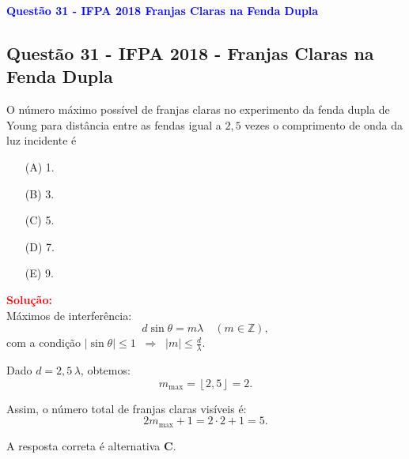 \begin{flushleft}
\textbf{\textcolor{blue}{\Large Quest\~ao 31 - IFPA 2018 Franjas Claras na Fenda Dupla}}\\
\noindent

\subsection{Quest\~ao 31 - IFPA 2018 - Franjas Claras na Fenda Dupla}

O número máximo possível de franjas claras no experimento da fenda dupla de Young para distância entre as fendas igual a 
$2{,}5$ vezes o comprimento de onda da luz incidente é

\begin{itemize}
\item[(A)] 1.
\item[(B)] 3.
\item[(C)] 5.
\item[(D)] 7.
\item[(E)] 9.
\end{itemize}

\vspace{0.5cm}

\textcolor{red}{\textbf{Solução:}}\\[2mm]

Máximos de interferência: 
\[
d\sin\theta = m\lambda \quad (m\in\mathbb{Z}),
\]
com a condição $|\sin\theta|\leq 1 \;\;\Rightarrow\;\; |m|\leq \frac{d}{\lambda}.
$

Dado $d = 2{,}5\,\lambda$, obtemos:
\[
m_{\max} = \left\lfloor 2{,}5 \right\rfloor = 2.
\]

Assim, o número total de franjas claras visíveis é:
\[
2m_{\max}+1 = 2\cdot2+1 = 5.
\]

A resposta correta é alternativa \colorbox{green!50}{\textbf{C}}.

\end{flushleft}

